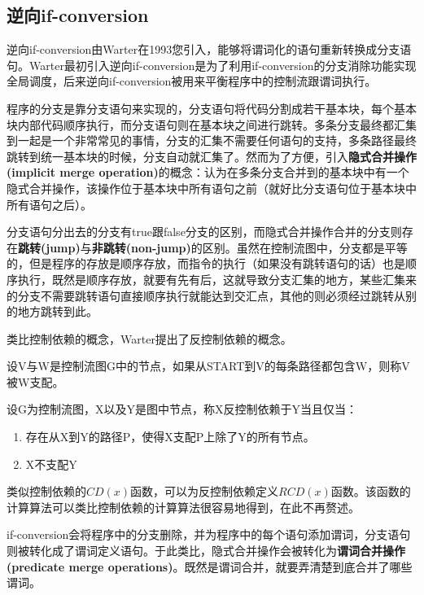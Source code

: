 \subsection{逆向if-conversion}

逆向if-conversion由Warter在1993您引入，能够将谓词化的语句重新转换成分支语句。Warter最初引入逆向if-conversion是为了利用if-conversion的分支消除功能实现全局调度，后来逆向if-conversion被用来平衡程序中的控制流跟谓词执行。

程序的分支是靠分支语句来实现的，分支语句将代码分割成若干基本块，每个基本块内部代码顺序执行，而分支语句则在基本块之间进行跳转。多条分支最终都汇集到一起是一个非常常见的事情，分支的汇集不需要任何语句的支持，多条路径最终跳转到统一基本块的时候，分支自动就汇集了。然而为了方便，引入\textbf{隐式合并操作(implicit merge operation)}的概念：认为在多条分支合并到的基本块中有一个隐式合并操作，该操作位于基本块中所有语句之前（就好比分支语句位于基本块中所有语句之后）。

分支语句分出去的分支有true跟false分支的区别，而隐式合并操作合并的分支则存在\textbf{跳转(jump)}与\textbf{非跳转(non-jump)}的区别。虽然在控制流图中，分支都是平等的，但是程序的存放是顺序存放，而指令的执行（如果没有跳转语句的话）也是顺序执行，既然是顺序存放，就要有先有后，这就导致分支汇集的地方，某些汇集来的分支不需要跳转语句直接顺序执行就能达到交汇点，其他的则必须经过跳转从别的地方跳转到此。

类比控制依赖的概念，Warter提出了反控制依赖的概念。

\begin{definition}[支配(dominate)]
设V与W是控制流图G中的节点，如果从START到V的每条路径都包含W，则称V被W支配。
\end{definition}

\begin{definition}
设G为控制流图，X以及Y是图中节点，称X反控制依赖于Y当且仅当：
\begin{enumerate}
\item 存在从X到Y的路径P，使得X支配P上除了Y的所有节点。
\item X不支配Y
\end{enumerate}
\end{definition}
类似控制依赖的$CD\left(x\right)$函数，可以为反控制依赖定义$RCD\left(x\right)$函数。该函数的计算算法可以类比控制依赖的计算算法很容易地得到，在此不再赘述。

if-conversion会将程序中的分支删除，并为程序中的每个语句添加谓词，分支语句则被转化成了谓词定义语句。于此类比，隐式合并操作会被转化为\textbf{谓词合并操作(predicate merge operations)}。既然是谓词合并，就要弄清楚到底合并了哪些谓词。

